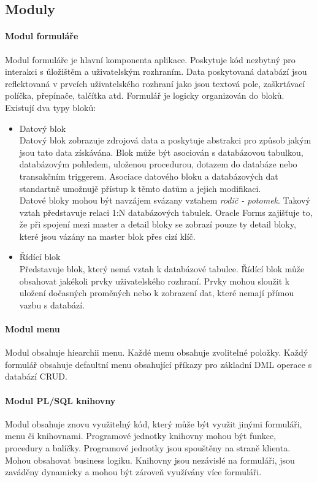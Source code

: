 \documentclass{diplomka}
\begin{document}
\subsection*{Moduly}

\paragraph{Modul formuláře} 
Modul formuláře je hlavní komponenta aplikace. Poskytuje kód nezbytný pro interakci s úložištěm a uživatelským rozhraním. 
Data poskytovaná databází jsou reflektovaná v prvcích uživatelského rozhraní jako jsou textová pole, zaškrtávací políčka, přepínače, talčítka atd. Formulář je logicky organizován do bloků. Existují dva typy bloků: 
\begin{itemize}
\item Datový blok\\ Datový blok zobrazuje zdrojová data a poskytuje abstrakci pro způsob jakým jsou tato data získávána. Blok může být asociován s databázovou tabulkou, databázovým pohledem, uloženou procedurou, dotazem do databáze nebo transakčním triggerem. Asociace datového bloku a databázových dat standartně umožnujě přístup k těmto datům a jejich modifikaci.\\ \indent
Datové bloky mohou být navzájem svázany vztahem \emph{rodič - potomek}. Takový vztah představuje relaci 1:N databázových tabulek. Oracle Forms zajišťuje to, že při spojení mezi master a detail bloky se zobrazí pouze ty detail bloky, které jsou vázány na master blok přes cizí klíč. 

\item Řídící blok \\
Představuje blok, který nemá vztah k databázové tabulce. Řídící blok může obsahovat jakékoli prvky uživatelského rozhraní. Prvky mohou sloužit k uložení dočasných proměných nebo k zobrazení dat, které nemají přímou vazbu s databází. 
\end{itemize}

\paragraph{Modul menu} 
Modul obsahuje hiearchii menu. Každé menu obsahuje zvolitelné položky. Každý formulář obsahuje defaultní menu obsahující příkazy pro základní DML operace s databází CRUD.

\paragraph{Modul PL/SQL knihovny}
Modul obsahuje znovu využitelný kód, který může být využit jinými formuláři, menu či knihovnami. Programové jednotky knihovny mohou být funkce, procedury a balíčky. Programové jednotky jsou spouštěny na straně klienta. Mohou obsahovat business logiku. Knihovny jsou nezávislé na formuláři, jsou zaváděny dynamicky a mohou být zároveň využívány více formuláři.
\end{document}
